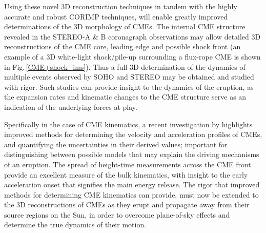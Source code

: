 \documentclass[preprint2]{aastex}
\begin{document}
Using these novel 3D reconstruction techniques in tandem with the highly accurate and robust CORIMP techniques, will enable greatly improved determinations of the 3D morphology of CMEs. The internal CME structure revealed in the STEREO-A \& B coronagraph observations may allow detailed 3D reconstructions of the CME core, leading edge and possible shock front (an example of a 3D white-light shock/pile-up surrounding a flux-rope CME is shown in Fig.\,\ref{CME+shock_ims}). Thus a full 3D determination of the dynamics of multiple events observed by SOHO and STEREO may be obtained and studied with rigor. Such studies can provide insight to the dynamics of the eruption, as the expansion rates and kinematic changes to the CME structure serve as an indication of the underlying forces at play.

Specifically in the case of CME kinematics, a recent investigation by \citet{2013arXiv1307.8155B} highlights improved methods for determining the velocity and acceleration profiles of CMEs, and quantifying the uncertainties in their derived values; important for distinguishing between possible models that may explain the driving mechanisms of an eruption. The spread of height-time measurements across the CME front provide an excellent measure of the bulk kinematics, with insight to the early acceleration onset that signifies the main energy release. The rigor that improved methods for determining CME kinematics can provide, must now be extended to the 3D reconstructions of CMEs as they erupt and propagate away from their source regions on the Sun, in order to overcome plane-of-sky effects and determine the true dynamics of their motion.
\end{document}
